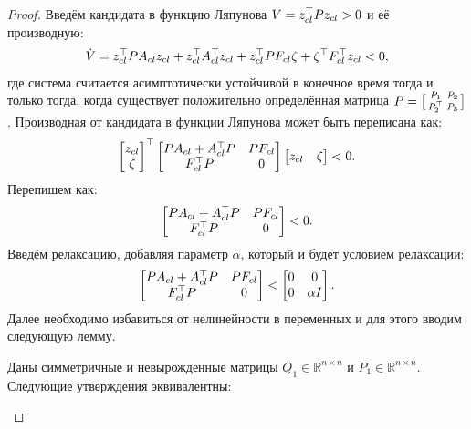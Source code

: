 \begin{proof}
	Введём кандидата в функцию Ляпунова ${V} = {z}_{cl}^\top {P}{z}_{cl} > 0$ и её производную:
	\begin{align}
		{\dot{V}} = {z}_{cl}^\top {P} {A}_{cl} {z}_{cl} +
		{z}_{cl}^\top {A}_{cl}^\top {z}_{cl} 
		+
		{z}_{cl}^\top {P} {F}_{cl} {\zeta} +
		{\zeta}^\top {F}_{cl}^\top {z}_{cl}
		< 0,
	\end{align}
	где система считается асимптотически устойчивой в конечное время тогда и только тогда, когда существует положительно определённая матрица ${P} = \bigl[ \begin{smallmatrix}  {P}_1 & {P}_2 \\ {P}_2^\top & {P}_3 \end{smallmatrix} \bigr]$.
	Производная от кандидата в функции Ляпунова может быть переписана как:
		\begin{align}
			\begin{bmatrix}
				z_{cl} \\ \zeta
			\end{bmatrix}^\top
		\begin{bmatrix}
			{P} {A}_{cl} + {A}_{cl}^\top {P} & {P} {F}_{cl} \\
			{F}_{cl} ^\top {P} & 0
		\end{bmatrix} 
		\begin{bmatrix}
			z_{cl} & \zeta
		\end{bmatrix} < 0.
	\end{align}
	Перепишем как:
	\begin{align}
		\begin{bmatrix}
			{P} {A}_{cl} + {A}_{cl}^\top {P} & {P} {F}_{cl} \\
			{F}_{cl} ^\top {P} & 0
		\end{bmatrix} < 0.
	\end{align}
	Введём релаксацию, добавляя параметр $\alpha$, который и будет условием релаксации:
	\begin{align}\label{eq: S procedure}
		\begin{bmatrix}
			{P} {A}_{cl} + {A}_{cl}^\top {P} & {P} {F}_{cl} \\
			{F}_{cl} ^\top {P} & 0
		\end{bmatrix} < 
		\begin{bmatrix}
			0 & 0\\
			0 & \alpha {I}
		\end{bmatrix}.
	\end{align}
	Далее необходимо избавиться от нелинейности в переменных и для этого вводим следующую лемму.
	\begin{lemma}
		Даны симметричные и невырожденные матрицы ${Q}_{1} \in \mathbb{R}^{n\times n}$ и ${P}_{1} \in \mathbb{R}^{n\times n}$. Следующие утверждения эквивалентны:\\
		

\end{lemma}
\end{proof}
